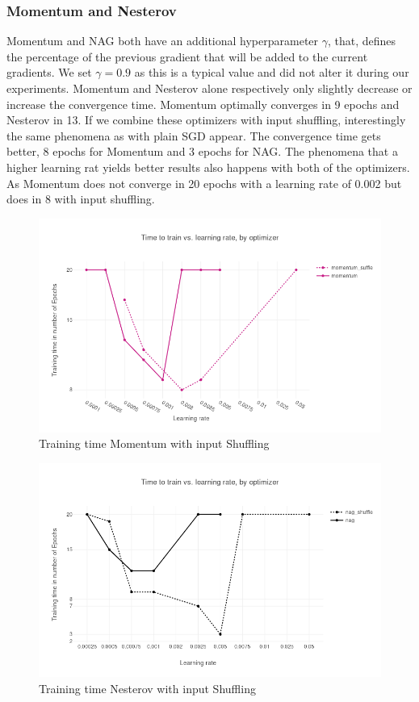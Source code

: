 \subsubsection{Momentum and Nesterov}
Momentum and NAG \cite{nag} both have an additional hyperparameter $\gamma$, that, defines the percentage of the previous gradient that will be added to the current gradients. We set $\gamma = 0.9$ as this is a typical value and did not alter it during our experiments. Momentum and Nesterov alone respectively only slightly decrease or increase the convergence time. Momentum optimally converges in 9 epochs and Nesterov in 13. If we combine these optimizers with input shuffling, interestingly the same phenomena as with plain SGD appear. The convergence time gets better, 8 epochs for Momentum and 3 epochs for NAG. The phenomena that a higher learning rat yields better results also happens with both of the optimizers. As Momentum does not converge in 20 epochs with a learning rate of 0.002 but does in 8 with input shuffling.
\begin{figure}[h]
\centering

\includegraphics[scale=0.3]{images/results_mom_shuffle}
\caption{Training time Momentum with input Shuffling}
\label{fig:results_mom}
\end{figure}

\begin{figure}[h]
\centering
\includegraphics[scale=0.3]{images/results_nag_shuffle}
\caption{Training time Nesterov with input Shuffling}
\label{fig:results_nag}
\end{figure}
